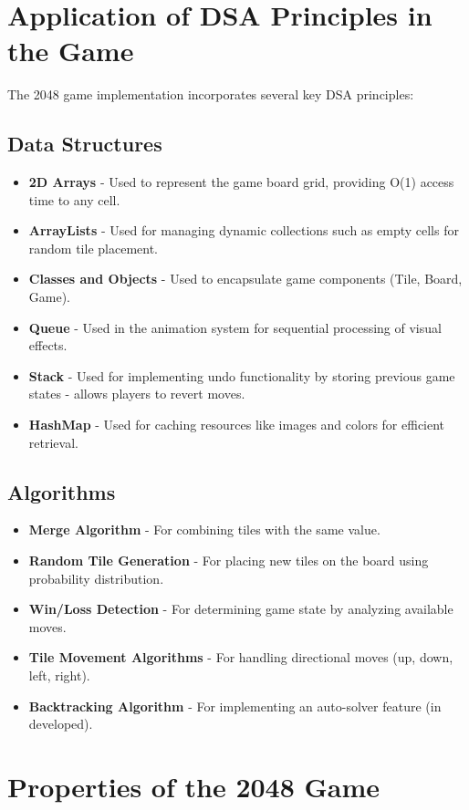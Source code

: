 \documentclass[12pt, a4paper]{article}
\begin{document}
\section{Application of DSA Principles in the Game}
The 2048 game implementation incorporates several key DSA principles:

\subsection{Data Structures}
\begin{itemize}
    \item \textbf{2D Arrays} - Used to represent the game board grid, providing O(1) access time to any cell.
    \item \textbf{ArrayLists} - Used for managing dynamic collections such as empty cells for random tile placement.
    \item \textbf{Classes and Objects} - Used to encapsulate game components (Tile, Board, Game).
    \item \textbf{Queue} - Used in the animation system for sequential processing of visual effects.
    \item \textbf{Stack} - Used for implementing undo functionality by storing previous game states - allows players to revert moves.
    \item \textbf{HashMap} - Used for caching resources like images and colors for efficient retrieval.
\end{itemize}

\subsection{Algorithms}
\begin{itemize}
    \item \textbf{Merge Algorithm} - For combining tiles with the same value.
    \item \textbf{Random Tile Generation} - For placing new tiles on the board using probability distribution.
    \item \textbf{Win/Loss Detection} - For determining game state by analyzing available moves.
    \item \textbf{Tile Movement Algorithms} - For handling directional moves (up, down, left, right).
    \item \textbf{Backtracking Algorithm} - For implementing an auto-solver feature (in developed).
\end{itemize}

\section{Properties of the 2048 Game}
\end{document}
